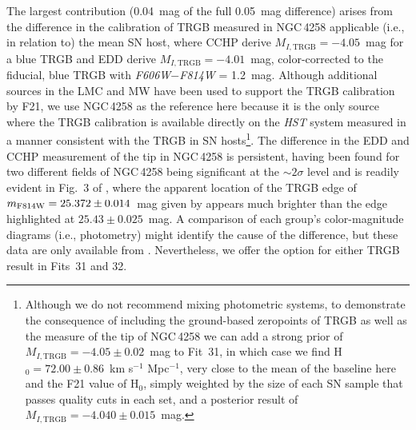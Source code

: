 \documentclass[12pt]{aastex631}
\newcommand{\kms}{km s$^{-1}$ Mpc$^{-1}$}
\begin{document}
The largest contribution (0.04~mag of the full 0.05~mag difference) arises from the difference in the calibration of TRGB measured in NGC$\,$4258 applicable (i.e., in relation to) the mean SN host, where CCHP derive $M_{I,\textrm{TRGB}}=-4.05$~mag for a blue TRGB and EDD derive $M_{I,\textrm{TRGB}}=-4.01$~mag, color-corrected to the fiducial, blue TRGB with {\it F606W$-$F814W} = 1.2~mag.  Although additional sources in the LMC and MW have been used to support the TRGB calibration by F21, we use NGC$\,$4258 as the reference here because it is the only source where the TRGB calibration is available directly on the {\it HST} system measured in a manner consistent with the TRGB in SN hosts\footnote{Although we do not recommend mixing photometric systems, to demonstrate the consequence of including the ground-based zeropoints of TRGB as well as the \citet{Jang:2021} measure of the tip of NGC$\,$4258 we can add a strong prior of $M_{I,\textrm{TRGB}}=-4.05\pm0.02$~mag to Fit~31, in which case we find H$_0=72.00 \pm 0.86$~\kms, very close to the mean of the baseline here and the F21 value of H$_0$, simply weighted by the size of each SN sample that passes quality cuts in each set, and a posterior result of $M_{I,\textrm{TRGB}}=-4.040\pm0.015$~mag.}.  The difference in the EDD and CCHP measurement of the tip in NGC$\,$4258 is persistent, having been found for two different fields of NGC$\,$4258 being significant at the $\sim 2\sigma$ level  and is readily evident in Fig.~3 of \citet{Anand:2021}, where the apparent location of the TRGB edge of $m_{\rm F814W}=25.372\pm 0.014$~mag given by \citet{Jang:2021} appears much brighter than the edge highlighted at $25.43\pm0.025$~mag.  A comparison of each group's color-magnitude diagrams (i.e., photometry) might identify the cause of the difference, but these data are only available from \citet{Anand:2021}.   Nevertheless, we offer the option for either TRGB result in Fits~31 and 32.
\end{document}
